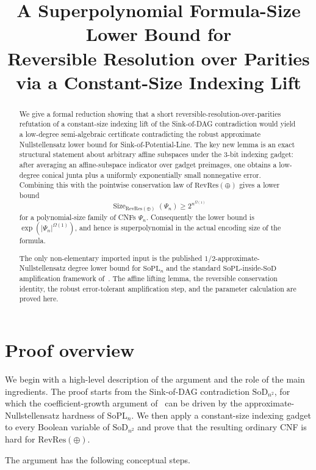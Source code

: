 \documentclass[11pt]{article}
\title{A Superpolynomial Formula-Size Lower Bound for\\
Reversible Resolution over Parities via a Constant-Size Indexing Lift}
\author{}
\date{}
\theoremstyle{definition}
\newcommand{\RevRes}{\mathrm{RevRes}}
\newcommand{\SoPL}{\mathrm{SoPL}}
\newcommand{\SoD}{\mathrm{SoD}}
\begin{document}
\maketitle

\begin{abstract}
We give a formal reduction showing that a short reversible-resolution-over-parities
refutation of a constant-size indexing lift of the Sink-of-DAG contradiction would yield
a low-degree semi-algebraic certificate contradicting the robust approximate
Nullstellensatz lower bound for Sink-of-Potential-Line.
The key new lemma is an exact structural statement about arbitrary affine subspaces
under the $3$-bit indexing gadget: after averaging an affine-subspace indicator over
gadget preimages, one obtains a low-degree conical junta plus a uniformly exponentially
small nonnegative error. Combining this with the pointwise conservation law of
$\RevRes(\oplus)$ gives a lower bound
\[
  \operatorname{Size}_{\RevRes(\oplus)}(\Psi_n)
  \ge 2^{n^{\Omega(1)}}
\]
for a polynomial-size family of CNFs $\Psi_n$. Consequently the lower bound is
$\exp(|\Psi_n|^{\Omega(1)})$, and hence is superpolynomial in the actual encoding size
of the formula.

The only non-elementary imported input is the published
$1/2$-approximate-Nullstellensatz degree lower bound for $\SoPL_n$ and the standard
$\SoPL$-inside-$\SoD$ amplification framework of~\cite{GHJMPRT}.  The affine lifting lemma,
the reversible conservation identity, the robust error-tolerant amplification step,
and the parameter calculation are proved here.
\end{abstract}

\tableofcontents

\section*{Proof overview}

We begin with a high-level description of the argument and the role of the main
ingredients.  The proof starts from the Sink-of-DAG contradiction $\SoD_{n^2}$,
for which the coefficient-growth argument of~\cite{GHJMPRT} can be driven by the
approximate-Nullstellensatz hardness of $\SoPL_n$.  We then apply a constant-size
indexing gadget to every Boolean variable of $\SoD_{n^2}$ and prove that the resulting
ordinary CNF is hard for $\RevRes(\oplus)$.

The argument has the following conceptual steps.
\end{document}
